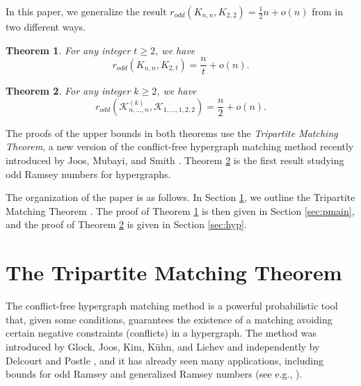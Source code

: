 \documentclass{article}
\newtheorem{theorem}{Theorem}
\theoremstyle{definition}
\newcommand\cK{{\mathcal K}}
\newcommand{\oram}{r_{odd}}
\begin{document}
In this paper, we generalize the result $\oram(K_{n,n},K_{2,2})=\frac{1}{2}n+o(n)$ from \cite{BHZ} in two different ways.



\begin{theorem} \label{thm: main_graph}
    For any integer $t\geq 2$, we have 
    \[\oram \left(K_{n,n}, K_{2,t} \right)=\frac{n}{t} + o(n).\]
\end{theorem}


\begin{theorem} \label{thm: main_hypergraph}
    For any integer $k\geq 2$, we have 
    \[\oram \left(\cK^{(k)}_{n,\dots,n}, \cK_{1,\dots,1,2,2} \right) = \frac{n}{2} + o(n).\]
\end{theorem}

The proofs of the upper bounds in both theorems use the {\em Tripartite Matching Theorem}, a new version of the conflict-free hypergraph matching method recently introduced by Joos, Mubayi, and Smith \cite{JMS}. Theorem \ref{thm: main_hypergraph} is the first result studying odd Ramsey numbers for hypergraphs.





The organization of the paper is as follows. In Section \ref{sec:method}, we outline the Tripartite Matching Theorem \cite{JMS}. The proof of Theorem \ref{thm: main_graph} is then given in Section \ref{sec:pmain}, and the proof of Theorem \ref{thm: main_hypergraph} is given in Section \ref{sec:hyp}.




\section{The Tripartite Matching Theorem} \label{sec:method}



The conflict-free hypergraph matching method 
is a powerful probabilistic tool that, given some conditions, guarantees the existence of a matching avoiding certain negative constraints (conflicts) in a hypergraph. 
The method was introduced by Glock, Joos, Kim, K\"uhn, and Lichev  \cite{GJKKL} and independently by Delcourt and Postle \cite{DP}, and it has already seen many applications, including bounds for odd Ramsey and generalized Ramsey numbers (see e.g., \cite{BBHZ,BDLP,BHZ,GHPSZ,JM,JMS,LM}). 
\end{document}
